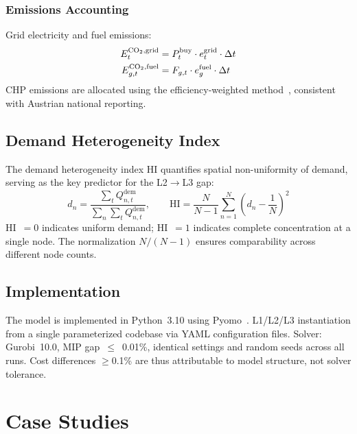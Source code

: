 \documentclass[review,3p]{elsarticle}
\begin{document}
\subsubsection{Emissions Accounting}

Grid electricity and fuel emissions:
\begin{align}
E_t^{\ce{CO2},\mathrm{grid}} &= P_t^{\mathrm{buy}}
\cdot e_t^{\mathrm{grid}} \cdot \Delta t
\label{eq:em_grid} \\
E_{g,t}^{\ce{CO2},\mathrm{fuel}} &= F_{g,t} \cdot e_g^{\mathrm{fuel}}
\cdot \Delta t
\label{eq:em_fuel}
\end{align}
CHP emissions are allocated using the efficiency-weighted
method~\cite{Lund2014_4GDH}, consistent with Austrian national
reporting.

\subsection{Demand Heterogeneity Index}
\label{sec:model_hi}

The demand heterogeneity index HI quantifies spatial non-uniformity
of demand, serving as the key predictor for the L2$\rightarrow$L3 gap:
\begin{equation}
d_n = \frac{\sum_t Q_{n,t}^{\mathrm{dem}}}{\sum_n \sum_t
Q_{n,t}^{\mathrm{dem}}}, \qquad
\mathrm{HI} = \frac{N}{N-1} \sum_{n=1}^{N}
\left(d_n - \frac{1}{N}\right)^2
\label{eq:hi}
\end{equation}
HI~$=0$ indicates uniform demand; HI~$=1$ indicates complete
concentration at a single node. The normalization $N/(N\!-\!1)$
ensures comparability across different node counts.

\subsection{Implementation}
\label{sec:model_impl}

The model is implemented in Python~3.10 using
Pyomo~\cite{pyomo}. L1/L2/L3 instantiation from a single
parameterized codebase via YAML configuration files. Solver:
Gurobi~10.0, MIP gap~$\leq$~0.01\%, identical settings and random
seeds across all runs. Cost differences $\geq$0.1\% are thus
attributable to model structure, not solver tolerance.

\section{Case Studies}
\label{sec:case_studies}
\end{document}
